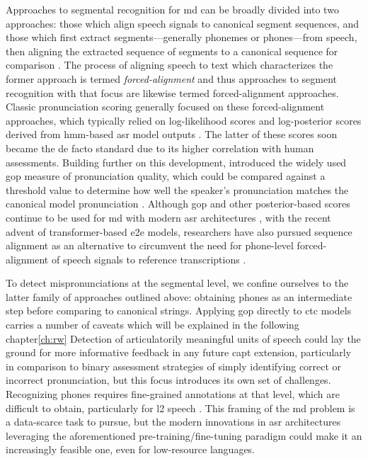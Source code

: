 \documentclass[thesis]{cluu}
\begin{document}
Approaches to segmental recognition for \gls{md} can be broadly divided into two approaches: those which align speech signals to canonical segment sequences, and those which first extract segments---generally phonemes or phones---from speech, then aligning the extracted sequence of segments to a canonical sequence for comparison \parencite{korzekwaComputerassistedPronunciationTraining2022}. The process of aligning speech to text which characterizes the former approach is termed \textit{forced-alignment} and thus approaches to segment recognition with that focus are likewise termed forced-alignment approaches. Classic pronunciation scoring generally focused on these forced-alignment approaches, which typically relied on log-likelihood scores and log-posterior scores derived from \gls{hmm}-based \gls{asr} model outputs \parencite{wittAutomaticErrorDetection}. The latter of these scores soon became the de facto standard due to its higher correlation with human assessments. Building further on this development, \textcite{witt2000use} introduced the widely used \gls{gop} measure of pronunciation quality, which could be compared against a threshold value to determine how well the speaker's pronunciation matches the canonical model pronunciation \parencite{witt2014computer}. Although \gls{gop} and other posterior-based scores continue to be used for \gls{md} with modern \gls{asr} architectures \parencite[inter alia]{parikhEvaluatingLogitBasedGOP2025,gongTransformerBasedMultiAspectMultiGranularity2022}, with the recent advent of transformer-based \gls{e2e} models, researchers have also pursued sequence alignment as an alternative to circumvent the need for phone-level forced-alignment of speech signals to reference transcriptions \parencite{loEffectiveEndtoEndModeling2020,leungCNNRNNCTCBasedEndtoend2019}. 

To detect mispronunciations at the segmental level, we confine ourselves to the latter family of approaches outlined above: obtaining phones as an intermediate step before comparing to canonical strings. Applying \gls{gop} directly to \gls{ctc} models carries a number of caveats which will be explained in the following chapter\ref{ch:rw} Detection of articulatorily meaningful units of speech could lay the ground for more informative feedback in any future \gls{capt} extension, particularly in comparison to binary assessment strategies of simply identifying correct or incorrect pronunciation, but this focus introduces its own set of challenges. Recognizing phones requires fine-grained annotations at that level, which are difficult to obtain, particularly for \gls{l2} speech \parencite{zhangL2GENNeuralPhoneme2022}. This framing of the \gls{md} problem is a data-scarce task to pursue, but the modern innovations in \gls{asr} architectures leveraging the aforementioned pre-training/fine-tuning paradigm could make it an increasingly feasible one, even for low-resource languages.
\end{document}
